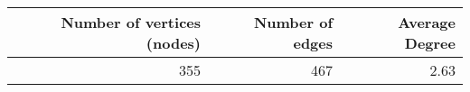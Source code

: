 \begin{tabular}{rrr}
\toprule
 Number of vertices (nodes) &  Number of edges &  Average Degree \\
\midrule
                        355 &              467 &            2.63 \\
\bottomrule
\end{tabular}
